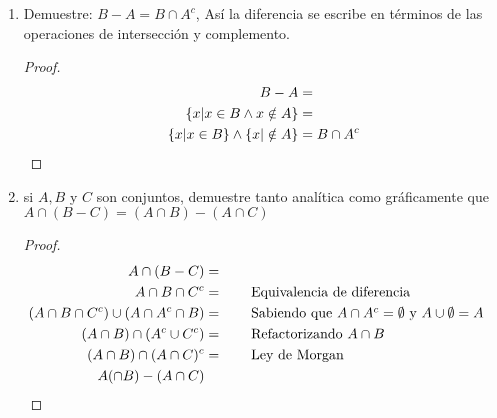 \documentclass[a4paper,10pt]{article}
\begin{document}
\begin{enumerate}
\begin{enumerate}[label=\alph*]
 \item $A-(A\cap B)=A-B$
 \begin{proof}
  \begin{align*}
  A-(A\cap B)&=
  \\A-A\cup A-B&=
  \\\emptyset\cup A-B&=A-B
  \end{align*}
 \end{proof}
 
 \item $(A-B)\cap(B-A)=\emptyset$
 \begin{proof}
  \begin{align*}
  (A-B)\cap(B-A)&=
  \\(A\cap B^c)\cap(B\cap A^c) &=
  \\(A\cap A^c)\cap(B\cap B^c) &= \emptyset
  \end{align*}
 \end{proof}
\item $A-(B\cup C)=(A-B)\cap(A-C)$
 \begin{proof}
  \begin{align*}
    A-(B\cup C)&=
    \\A\cap(B\cup C)^c&=
    \\A\cap B^c\cap C^c&=
    \\(A\cap B^c)\cap(A\cap C^c) &= (A-B)\cap(A-C)
  \end{align*}
 \end{proof}
\end{enumerate}
\item Demuestre: $B-A=B\cap A^c$, Así la diferencia se escribe en términos de las operaciones de intersección y complemento.
\begin{proof}
 \begin{align*}
 B-A &=
 \\\{x|x\in B\land x\notin A\} &= 
 \\\{x|x\in B\}\land\{x|\notin A\}&=B\cap A^c \qedhere
 \end{align*} 
\end{proof}

\item si $A, B$ y $C$ son conjuntos, demuestre tanto analítica como gráficamente que 
\\$A\cap(B-C)=(A\cap B)-(A\cap C)$
\begin{proof}
 \begin{align*}
 A\cap(B-C)&=
 \\A\cap B\cap C^c&= \tag*{Equivalencia de diferencia}
 \\(A\cap B\cap C^c)\cup(A\cap A^c\cap B) &= \tag*{Sabiendo que $A\cap A^c = \emptyset$ y $A\cup\emptyset = A$}
 \\(A\cap B)\cap(A^c\cup C^c)&= \tag*{Refactorizando $A\cap B$}
 \\(A\cap B)\cap(A\cap C)^c&= \tag*{Ley de Morgan}
 \\A(\cap B)-(A\cap C) &&\qedhere
 \end{align*} 
\end{proof}
\end{enumerate}
\end{document}

